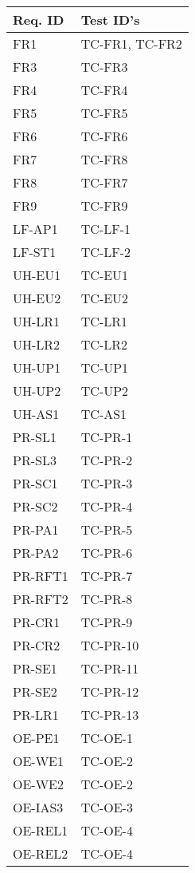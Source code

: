 \documentclass[12pt, titlepage]{article}
\begin{document}
\begin{longtable}{|l|l|}
  \hline
  \textbf{Req. ID} & \textbf{Test ID's} \\
  \hline
  FR1 & TC-FR1, TC-FR2\\ \hline
  FR3 & TC-FR3\\ \hline
  FR4 & TC-FR4\\ \hline
  FR5 & TC-FR5\\ \hline
  FR6 & TC-FR6\\ \hline
  FR7 & TC-FR8\\ \hline
  FR8 & TC-FR7\\ \hline
  FR9 & TC-FR9\\ \hline
  LF-AP1 & TC-LF-1 \\ \hline
  LF-ST1 & TC-LF-2 \\ \hline
  UH-EU1 & TC-EU1\\ \hline
  UH-EU2 & TC-EU2\\ \hline
  UH-LR1 & TC-LR1\\ \hline
  UH-LR2 & TC-LR2\\ \hline
  UH-UP1 & TC-UP1\\ \hline
  UH-UP2 & TC-UP2\\ \hline
  UH-AS1 & TC-AS1\\ \hline
  PR-SL1 & TC-PR-1\\ \hline
  PR-SL3 & TC-PR-2\\ \hline
  PR-SC1 & TC-PR-3\\ \hline
  PR-SC2 & TC-PR-4\\ \hline
  PR-PA1 & TC-PR-5\\ \hline
  PR-PA2 & TC-PR-6\\ \hline
  PR-RFT1 & TC-PR-7\\ \hline
  PR-RFT2 & TC-PR-8\\ \hline
  PR-CR1 & TC-PR-9\\ \hline
  PR-CR2 & TC-PR-10\\ \hline
  PR-SE1 & TC-PR-11\\ \hline
  PR-SE2 & TC-PR-12\\ \hline
  PR-LR1 & TC-PR-13\\ \hline
  OE-PE1 & TC-OE-1 \\ \hline
  OE-WE1 & TC-OE-2 \\ \hline
  OE-WE2 & TC-OE-2 \\ \hline
  OE-IAS3 & TC-OE-3 \\ \hline
  OE-REL1 & TC-OE-4 \\ \hline
  OE-REL2 & TC-OE-4 \\ \hline

\end{longtable}
\end{document}
